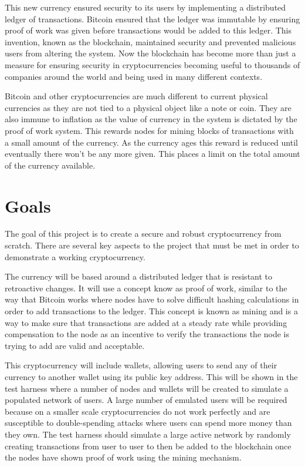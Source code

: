 \documentclass{l4proj}
\begin{document}
This new currency ensured security to its users by implementing a distributed ledger of transactions. Bitcoin
ensured that the ledger was immutable by ensuring proof of work was given before transactions would be
added to this ledger. This invention, known as the blockchain, maintained security and prevented malicious
users from altering the system. Now the blockchain has become more than just a measure for ensuring security
in cryptocurrencies becoming useful to thousands of companies around the world and being used
in many different contexts.

Bitcoin and other cryptocurrencies are much different to current physical currencies as they are not tied to a physical
object like a note or coin. They are also immune to inflation as the value of currency in the system is dictated
by the proof of work system. This rewards nodes for mining blocks of transactions with a small amount of the 
currency. As the currency ages this reward is reduced until eventually there won't be any more given. This places
a limit on the total amount of the currency available. 

\section{Goals}
The goal of this project is to create a secure and robust cryptocurrency from scratch. There are several key aspects
to the project that must be met in order to demonstrate a working cryptocurrency.

The currency will be based around
a distributed ledger that is resistant to retroactive changes. It will use a concept know as proof of work,
similar to the way that Bitcoin works where nodes have to solve difficult hashing calculations in order
to add transactions to the ledger. This concept is known as mining and is a way to make sure that transactions
are added at a steady rate while providing compensation to the node as an incentive to verify the transactions the node
is trying to add are valid and acceptable.

This cryptocurrency will include wallets, allowing users to send any of their currency to another
wallet using its public key address. This will be shown in the test harness where a number of nodes and wallets 
will be created to simulate a populated network of users. A large number of emulated users will be required because on
a smaller scale cryptocurrencies do not work perfectly and are susceptible to double-spending attacks where users
can spend more money than they own. The test harness should simulate a large active network by randomly creating
transactions from user to user to then be added to the blockchain once the nodes have shown proof of work using 
the mining mechanism.
\end{document}
